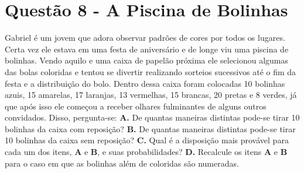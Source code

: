 \documentclass[a4paper, 12pt]{article}
\begin{document}
\section*{Questão 8 - A Piscina de Bolinhas}
\large {Gabriel é um jovem que adora observar padrões de cores por todos os lugares. Certa vez ele estava em uma festa de aniversário e de longe viu uma piscina de bolinhas. Vendo aquilo e uma caixa de papelão próxima ele selecionou algumas das bolas coloridas e tentou se divertir realizando sorteios sucessivos até o fim da festa e a distribuição do bolo. 
\newline
Dentro dessa caixa foram colocadas 10 bolinhas azuis, 15 amarelas, 17 laranjas, 13 vermelhas, 15 brancas, 20 pretas e 8 verdes, já que após isso ele começou a receber olhares fulminantes de alguns outros convidados. Disso, pergunta-se:}
\newline
\newline
\textbf{A.}  De quantas maneiras distintas pode-se tirar 10 bolinhas da caixa com reposição?
\newline
\newline
\textbf{B.} De quantas maneiras distintas pode-se tirar 10 bolinhas da caixa sem reposição?
\newline
\newline
\textbf{C.}   Qual é a disposição mais provável para cada um dos itens, \textbf{A} e \textbf{B}, e suas probabilidades?
\newline
\newline
\textbf{D.} Recalcule os itens \textbf{A} e \textbf{B} para o caso em que as bolinhas além de coloridas são numeradas.
\end{document}
